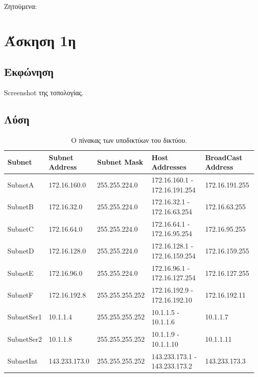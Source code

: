 \documentclass{assignment}
\begin{document}
Ζητούμενα:


\section{Άσκηση 1η}
\subsection*{Εκφώνηση}

Screenshot της τοπολογίας.

\subsection*{Λύση}

\begin{table}
\begin{center}
  \begin{tabular}{|m{2.3cm}|m{2.9cm}|m{3.5cm}|m{3.4cm}|m{3.3cm}|}
    \hline
    Subnet & Subnet Address & Subnet Mask & Host Addresses & BroadCast Address \\ \hline
  SubnetA & 172.16.160.0 & 255.255.224.0 & 172.16.160.1 - 172.16.191.254 & 172.16.191.255 \\ \hline
  SubnetB & 172.16.32.0 & 255.255.224.0 & 172.16.32.1 - 172.16.63.254 & 172.16.63.255 \\ \hline
  SubnetC & 172.16.64.0 & 255.255.224.0 & 172.16.64.1 - 172.16.95.254 & 172.16.95.255 \\ \hline
  SubnetD & 172.16.128.0 & 255.255.224.0 & 172.16.128.1 - 172.16.159.254 & 172.16.159.255 \\ \hline
  SubnetE & 172.16.96.0 & 255.255.224.0 & 172.16.96.1 - 172.16.127.254 & 172.16.127.255 \\ \hline
  SubnetF & 172.16.192.8 & 255.255.255.252 & 172.16.192.9 - 172.16.192.10 & 172.16.192.11 \\ \hline
  SubnetSer1 & 10.1.1.4 & 255.255.255.252 & 10.1.1.5 - 10.1.1.6 & 10.1.1.7 \\ \hline
  SubnetSer2 & 10.1.1.8 & 255.255.255.252 & 10.1.1.9 - 10.1.1.10 & 10.1.1.11 \\ \hline
  SubnetInt & 143.233.173.0 & 255.255.255.252 & 143.233.173.1 - 143.233.173.2 & 143.233.173.3 \\ \hline
  
  \end{tabular}
\caption{Ο πίνακας των υποδικτύων του δικτύου.}
\label{table:VLSM_subnetting}
\end{center}
\end{table}
\end{document}
